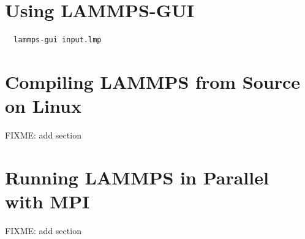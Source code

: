 \documentclass[9pt,tutorial]{livecoms}
\begin{document}
\begin{appendices}
  \section{Using LAMMPS-GUI}
  \label{using-lammps-gui}

  { \normalsize
\begin{verbatim}
  lammps-gui input.lmp
\end{verbatim}
  }

  \section{Compiling LAMMPS from Source on Linux}
  \label{compiling-lammps-label}
  FIXME: add section






  \section{Running LAMMPS in Parallel with MPI}
  \label{parallel-lammps-label}
  FIXME: add section
\end{appendices}
\end{document}
